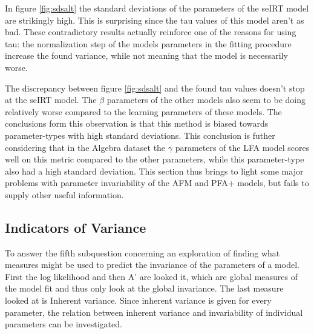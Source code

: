 \documentclass{scrartcl}
\begin{document}
In figure \ref{fig:sdsalt} the standard deviations of the parameters of the seIRT model are strikingly high. This is surprising since the tau values of this model aren't as bad. These contradictory results actually reinforce one of the reasons for using tau: the normalization step of the models parameters in the fitting procedure increase the found variance, while not meaning that the model is necessarily worse.

The discrepancy between figure \ref{fig:sdsalt} and the found tau values doesn't stop at the seIRT model. The $\beta$ parameters of the other models also seem to be doing relatively worse compared to the learning parameters of these models. The conclusions form this observation is that this method is biased towards parameter-types with high standard deviations. This conclusion is futher considering that in the Algebra dataset the $\gamma$ parameters of the LFA model scores well on this metric compared to the other parameters, while this parameter-type also had a high standard deviation. This section thus brings to light some major problems with parameter invariability of the AFM and PFA+ models, but fails to supply other useful information.

\subsection{Indicators of Variance}
To answer the fifth subquestion concerning an exploration of finding what measures might be used to predict the invariance of the parameters of a model. First the log likelihood and then A' are looked it, which are global measures of the model fit and thus only look at the global invariance. The last measure looked at is Inherent variance. Since inherent variance is given for every parameter, the relation between inherent variance and invariability of individual parameters can be investigated.
\end{document}
